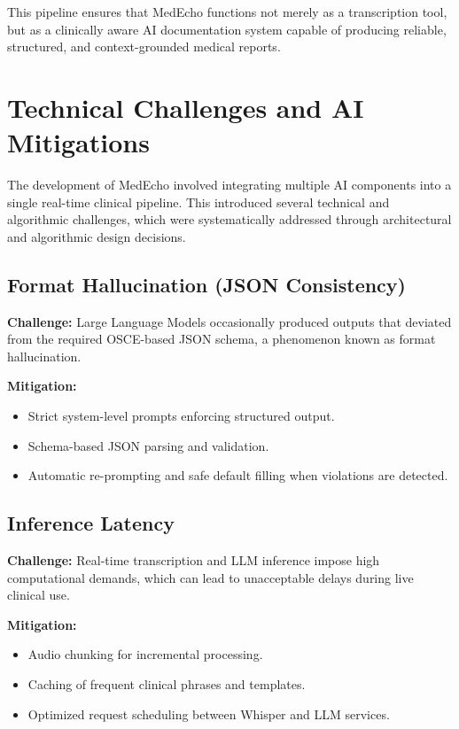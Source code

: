 This pipeline ensures that MedEcho functions not merely as a transcription tool, but as a clinically aware AI documentation system capable of producing reliable, structured, and context-grounded medical reports.

\section{Technical Challenges and AI Mitigations}
\label{sec:impl:challenges}

The development of MedEcho involved integrating multiple AI components into a single real-time clinical pipeline. This introduced several technical and algorithmic challenges, which were systematically addressed through architectural and algorithmic design decisions.

\subsection*{Format Hallucination (JSON Consistency)}

\textbf{Challenge:}  
Large Language Models occasionally produced outputs that deviated from the required OSCE-based JSON schema, a phenomenon known as format hallucination.

\textbf{Mitigation:}
\begin{itemize}
    \item Strict system-level prompts enforcing structured output.
    \item Schema-based JSON parsing and validation.
    \item Automatic re-prompting and safe default filling when violations are detected.
\end{itemize}

\subsection*{Inference Latency}

\textbf{Challenge:}  
Real-time transcription and LLM inference impose high computational demands, which can lead to unacceptable delays during live clinical use.

\textbf{Mitigation:}
\begin{itemize}
    \item Audio chunking for incremental processing.
    \item Caching of frequent clinical phrases and templates.
    \item Optimized request scheduling between Whisper and LLM services.
\end{itemize}

